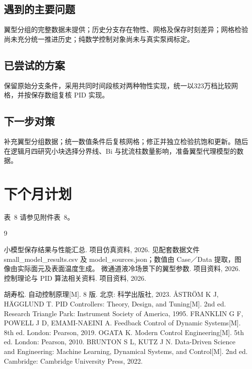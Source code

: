 \documentclass[stage2,fontset=fandol]{ydzjreport}
\makeatletter
\newcommand{\submissionnumber}[1]{\def\@currentlabel{#1}}
\makeatother
\begin{document}
\subsection{遇到的主要问题}

翼型分组的完整数据未提供；历史分支存在物性、网格及保存时刻差异；网格检验尚未充分统一推进历史；纯数学控制对象尚未与真实泵阀标定。

\subsection{已尝试的方案}

保留原始分支条件，采用共同时间段核对两种物性实现，统一以323万档比较网格，并按保存数组复核 PID 实现。

\subsection{下一步对策}

补充翼型分组数据；统一数值条件后复核网格；修正并独立检验抗饱和更新。随后在逻辑月四研究小块选择分界线、Bi 与扰流柱数量影响，准备翼型代理模型的数据。

\section{下个月计划}


\par\noindent \begingroup\submissionnumber{8}\label{tab:plan}\endgroup 表~8 请参见附件表~8。\par




\begin{thebibliography}{9}

 小模型保存结果与性能汇总. 项目仿真资料, 2026. 见配套数据文件 small\_model\_results.csv 及 model\_sources.json；数值由 Case／Data 提取，图像由实际面元及表面温度生成。
 微通道液冷场景下的翼型参数. 项目资料, 2026.
 控制理论与 PID 算法相关资料. 项目资料, 2026.

 胡寿松. 自动控制原理[M]. 8 版. 北京: 科学出版社, 2023.
 {\AA}STR{\"O}M K J, H{\"A}GGLUND T. PID Controllers: Theory, Design, and Tuning[M]. 2nd ed. Research Triangle Park: Instrument Society of America, 1995.
 FRANKLIN G F, POWELL J D, EMAMI-NAEINI A. Feedback Control of Dynamic Systems[M]. 8th ed. London: Pearson, 2019.
 OGATA K. Modern Control Engineering[M]. 5th ed. London: Pearson, 2010.
 BRUNTON S L, KUTZ J N. Data-Driven Science and Engineering: Machine Learning, Dynamical Systems, and Control[M]. 2nd ed. Cambridge: Cambridge University Press, 2022.
\end{thebibliography}
\end{document}
